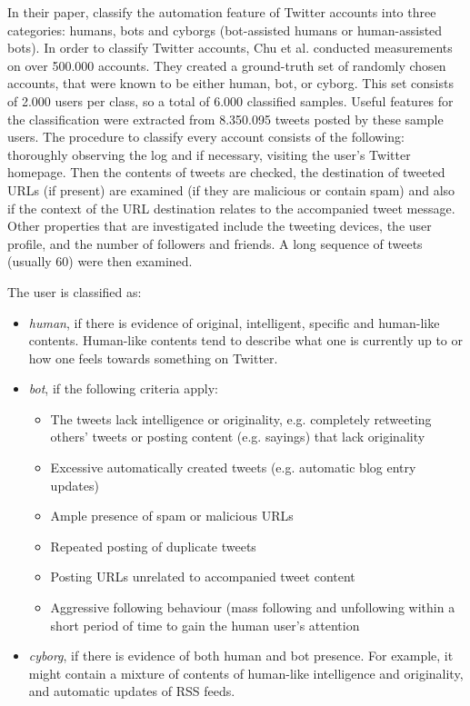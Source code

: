         In their paper, \textcite[811, 813-814]{DetectingAutomation} classify the automation feature of Twitter accounts into three categories: humans, bots and cyborgs (bot-assisted humans or human-assisted bots). In order to classify Twitter accounts, Chu et al. conducted measurements on over 500.000 accounts. They created a ground-truth set of randomly chosen accounts, that were known to be either human, bot, or cyborg. This set consists of 2.000 users per class, so a total of 6.000 classified samples. Useful features for the classification were extracted from 8.350.095 tweets posted by these sample users. The procedure to classify every account consists of the following: thoroughly observing the log and if necessary, visiting the user’s Twitter homepage. Then the contents of tweets are checked, the destination of tweeted URLs (if present) are examined (if they are malicious or contain spam) and also if the context of the URL destination relates to the accompanied tweet message. Other properties that are investigated include the tweeting devices, the user profile, and the number of followers and friends. A long sequence of tweets (usually 60) were then examined.

       
        
        The user is classified as:
        \begin{itemize}
        	\item \textit{human}, if there is evidence of original, intelligent, specific and human-like contents. Human-like contents tend to describe what one is currently up to or how one feels towards something on Twitter.  
        
        	\item \textit{bot}, if the following criteria apply:
        	    \begin{itemize}
        	        \item The tweets lack intelligence or originality, e.g. completely retweeting others’ tweets or posting content (e.g. sayings) that lack originality
        	        \item Excessive automatically created tweets (e.g. automatic blog entry updates)
        	        \item Ample presence of spam or malicious URLs
        	        \item Repeated posting of duplicate tweets
        	        \item Posting URLs unrelated to accompanied tweet content
        	        \item Aggressive following behaviour (mass following and unfollowing within a short period of time to gain the human user’s attention
        	    \end{itemize}
        	    
        	    \item \textit{cyborg}, if there is evidence of both human and bot presence. For example, it might contain a mixture of contents of human-like intelligence and originality, and automatic updates of RSS feeds.
        \end{itemize}
        
